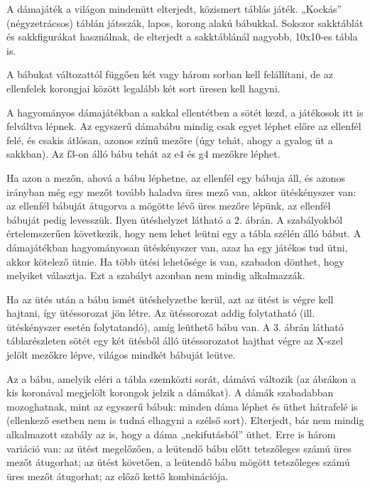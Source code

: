 

A dámajáték a világon mindenütt elterjedt, közismert táblás játék. „Kockás” (négyzetrácsos) táblán játsszák, lapos, korong alakú bábukkal. Sokszor sakktáblát és sakkfigurákat használnak, de elterjedt a sakktáblánál nagyobb, 10x10-es tábla is.

A bábukat változattól függően két vagy három sorban kell felállítani, de az ellenfelek korongjai között legalább két sort üresen kell hagyni.

A hagyományos dámajátékban a sakkal ellentétben a sötét kezd, a játékosok itt is felváltva lépnek. Az egyszerű dámabábu mindig csak egyet léphet előre az ellenfél felé, és csakis átlósan, azonos színű mezőre (úgy tehát, ahogy a gyalog üt a sakkban). Az f3-on álló bábu tehát az e4 és g4 mezőkre léphet.

Ha azon a mezőn, ahová a bábu léphetne, az ellenfél egy bábuja áll, és azonos irányban még egy mezőt tovább haladva üres mező van, akkor ütéskényszer van: az ellenfél bábuját átugorva a mögötte lévő üres mezőre lépünk, az ellenfél bábuját pedig levesszük. Ilyen ütéshelyzet látható a 2. ábrán. A szabályokból értelemszerűen következik, hogy nem lehet leütni egy a tábla szélén álló bábut. A dámajátékban hagyományosan ütéskényszer van, azaz ha egy játékos tud ütni, akkor kötelező ütnie. Ha több ütési lehetősége is van, szabadon dönthet, hogy melyiket választja. Ezt a szabályt azonban nem mindig alkalmazzák.

Ha az ütés után a bábu ismét ütéshelyzetbe kerül, azt az ütést is végre kell hajtani, így ütéssorozat jön létre. Az ütéssorozat addig folytatható (ill. ütéskényszer esetén folytatandó), amíg leüthető bábu van. A 3. ábrán látható táblarészleten sötét egy két ütésből álló ütéssorozatot hajthat végre az X-szel jelölt mezőkre lépve, világos mindkét bábuját leütve.

Az a bábu, amelyik eléri a tábla szemközti sorát, dámává változik (az ábrákon a kis koronával megjelölt korongok jelzik a dámákat). A dámák szabadabban mozoghatnak, mint az egyszerű bábuk: minden dáma léphet és üthet hátrafelé is (ellenkező esetben nem is tudná elhagyni a szélső sort).
Elterjedt, bár nem mindig alkalmazott szabály az is, hogy a dáma „nekifutásból” üthet. Erre is három variáció van:
az ütést megelőzően, a leütendő bábu előtt tetszőleges számú üres mezőt átugorhat;
az ütést követően, a leütendő bábu mögött tetszőleges számú üres mezőt átugorhat;
az előző kettő kombinációja.

